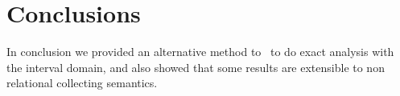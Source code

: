 \chapter{Conclusions}\label{ch:conclusion}

In conclusion we provided an alternative method to~\cite{Gawlitza2009}
to do exact analysis with the interval domain, and also showed that
some results are extensible to non relational collecting semantics.
